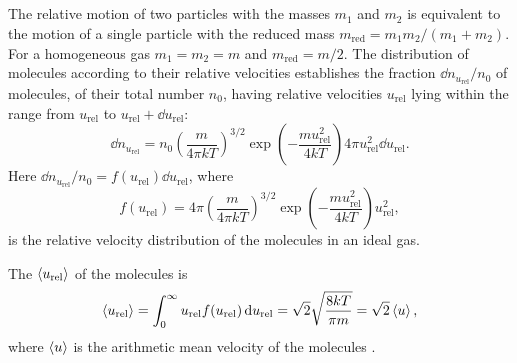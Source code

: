 \subsection{}\label{10.3.8} The relative motion  of two particles with the masses $m_{1}$ and $m_{2}$ is equivalent to the motion of a single particle with the reduced mass $m_{\textrm{red}} = m_{1}m_{2}/(m_{1}+ m_{2})$. For a homo­geneous gas $m_{1}= m_{2}= m$ and $m_{\textrm{red}} = m/2$. The distribution of molecules according to their relative velocities establishes the fraction $\dd n_{u_{\textrm{rel}}}/n_{0}$ of molecules, of their total number $n_{0}$,
having relative velocities $u_{\textrm{rel}}$ lying within the range from $u_{\textrm{rel}}$  to $u_{\textrm{rel}} + \dd u_{\textrm{rel}}$:
\begin{equation*}%
\dd n_{u_{\textrm{rel}}} = n_{0} \left( \frac{m}{4 \pi kT}\right)^{3/2} \exp \left(- \frac{mu^{2}_{\textrm{rel}}}{4kT} \right) 4 \pi u^{2}_{\textrm{rel}} \dd u_{\textrm{rel}}.
\end{equation*}
Here $\dd n_{u_{\textrm{rel}}} / n_{0}= f(u_{\textrm{rel}}) \dd u_{\textrm{rel}}$, where 
\begin{equation*}%
f(u_{\textrm{rel}}) = 4 \pi \left( \frac{m}{4 \pi kT} \right)^{3/2}\exp \left(- \frac{m u^{2}_{\textrm{rel}}}{4kT} \right) u_{\textrm{rel}}^{2},
\end{equation*}
is the relative velocity distribution of the molecules in an ideal gas.

 The  $\expval{u_{\textrm{rel}}}$ of the mole­cules is
\begin{equation*}%
\expval{u_{\textrm{rel}}} = \int_{0}^{\infty} u_{\textrm{rel}} f(u_{\textrm{rel}}) \, \dd u_{\textrm{rel}} = \sqrt{2} \sqrt{\frac{8kT}{\pi m}} = \sqrt{2} \expval{u},
\end{equation*}
where $\expval{u}$ is the arithmetic mean velocity of the molecules .


